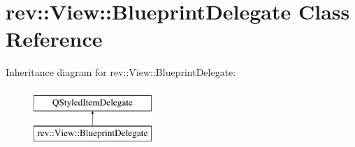 \hypertarget{classrev_1_1_view_1_1_blueprint_delegate}{}\section{rev\+::View\+::Blueprint\+Delegate Class Reference}
\label{classrev_1_1_view_1_1_blueprint_delegate}
Inheritance diagram for rev\+::View\+::Blueprint\+Delegate\+:\begin{figure}[H]
\begin{center}
\leavevmode
\includegraphics[height=2.000000cm]{classrev_1_1_view_1_1_blueprint_delegate}
\end{center}
\end{figure}
